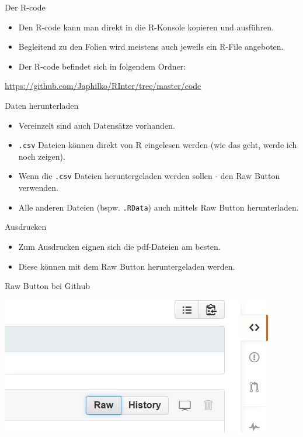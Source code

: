\documentclass[ignorenonframetext,]{beamer}
\providecommand{\tightlist}{%
\setlength{\itemsep}{0pt}\setlength{\parskip}{0pt}}
\begin{document}
\begin{frame}{Der R-code}

\begin{itemize}
\tightlist
\item
  Den R-code kann man direkt in die R-Konsole kopieren und ausführen.
\item
  Begleitend zu den Folien wird meistens auch jeweils ein R-File
  angeboten.
\item
  Der R-code befindet sich in folgendem Ordner:
\end{itemize}

\url{https://github.com/Japhilko/RInter/tree/master/code}

\end{frame}

\begin{frame}[fragile]{Daten herunterladen}

\begin{itemize}
\item
  Vereinzelt sind auch Datensätze vorhanden.
\item
  \texttt{.csv} Dateien können direkt von R eingelesen werden (wie das
  geht, werde ich noch zeigen).
\item
  Wenn die \texttt{.csv} Dateien heruntergeladen werden sollen - den Raw
  Button verwenden.
\item
  Alle anderen Dateien (bspw. \texttt{.RData}) auch mittels Raw Button
  herunterladen.
\end{itemize}

\end{frame}

\begin{frame}{Ausdrucken}

\begin{itemize}
\item
  Zum Ausdrucken eignen sich die pdf-Dateien am besten.
\item
  Diese können mit dem Raw Button heruntergeladen werden.
\end{itemize}

\begin{block}{Raw Button bei Github}

\includegraphics{./tex2pdf.956/f21c789340eb93fc24ffedb3e3f88df872b9bb2c.png}

\end{block}

\end{frame}
\end{document}
